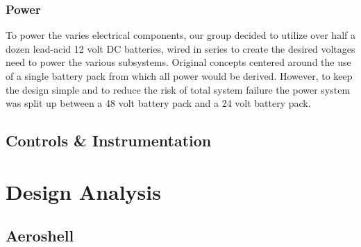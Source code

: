 \subsubsection{Power}

\indent\indent To power the varies electrical components, our group decided to utilize over half a dozen lead-acid 12 volt DC batteries, wired in series to create the desired voltages need to power the various subsystems. Original concepts centered around the use of a single battery pack from which all power would be derived. However, to keep the design simple and to reduce the risk of total system failure the power system was split up between a 48 volt battery pack and a 24 volt battery pack. 


\subsection{Controls \& Instrumentation}




\section{Design Analysis}

\subsection{Aeroshell}

